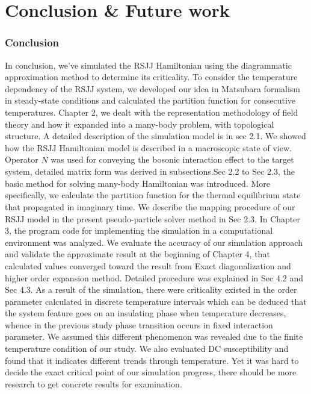 \documentclass{article}[12pt]
\numberwithin{equation}{section}
\begin{document}
\section{Conclusion \& Future work}
\begin{spacing}{1.5}
    \subsubsection*{Conclusion}
In conclusion, we’ve simulated the RSJJ Hamiltonian using the diagrammatic approximation method to determine its criticality. 
To consider the temperature dependency of the RSJJ system, we developed our idea in Matsubara formalism in steady-state conditions 
and calculated the partition function for consecutive temperatures. Chapter 2, we dealt with the representation methodology of field theory 
and how it expanded into a many-body problem, with topological structure. A detailed description of the simulation model is in sec 2.1. We showed how the RSJJ Hamiltonian model 
is described in a macroscopic state of view. Operator $\hat{N}$ was used for conveying the bosonic interaction effect to the target system, 
detailed matrix form was derived in subsections.Sec 2.2 to Sec 2.3, 
the basic method for solving many-body Hamiltonian was introduced. More specifically, 
we calculate the partition function for the thermal equilibrium state that propagated in imaginary time. 
We describe the mapping procedure of our RSJJ model in the present pseudo-particle solver method in Sec 2.3.  
 In Chapter 3, the program code for implementing the simulation in a computational environment 
was analyzed. We evaluate the accuracy of our simulation approach and validate the approximate result at the beginning of Chapter 4, 
that calculated values converged toward the result from Exact diagonalization and higher order expansion method. 
Detailed procedure was explained in Sec 4.2 and Sec 4.3. As a result of the simulation, 
there were criticality existed in the order parameter calculated in discrete temperature intervals 
which can be deduced that the system feature goes on an insulating phase when temperature decreases, 
whence in the previous study phase transition occurs in fixed interaction parameter. 
We assumed this different phenomenon was revealed due to the finite temperature condition of our study. 
We also evaluated DC susceptibility and found that it indicates different trends through temperature. 
Yet it was hard to decide the exact critical point of our simulation progress, there should be more research to get concrete results for examination. 

\end{spacing}
\end{document}
